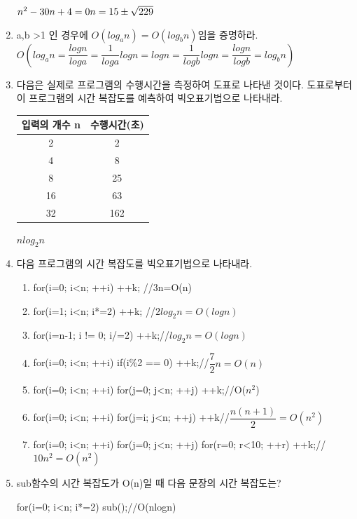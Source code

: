 \documentclass[11pt,a4paper]{article}
\begin{document}
\begin{enumerate}
$n^2-30n+4=0\\n=15\pm\sqrt{229}$

\item a,b \textgreater 1 인 경우에 $O(log_an) = O(log_bn)$임을 증명하라.\\
$O(log_an=\dfrac{logn}{loga}=\dfrac{1}{loga}logn=logn=\dfrac{1}{logb}logn=\dfrac{logn}{logb}=log_bn)$

\item 다음은 실제로 프로그램의 수행시간을 측정하여 도표로 나타낸 것이다. 도표로부터 이 프로그램의 시간 복잡도를 예측하여 빅오표기법으로 나타내라.\\

\begin{tabular}{c|c}
	
	입력의 개수 n & 수행시간(초)\\
	\hline
	2&2\\
	4&8\\
	8&25\\16&63\\32&162\\
\end{tabular}
	
	$nlog_2n$
	
\item 다음 프로그램의 시간 복잡도를 빅오표기법으로 나타내라.
\begin{enumerate}
	\item for(i=0; i\textless n; ++i) ++k; //3n=O(n)
	\item for(i=1; i\textless n; i*=2) ++k; //$2log_2n=O(logn)$
	\item for(i=n-1; i != 0; i/=2) ++k;//$log_2n=O(logn)$
	\item for(i=0; i\textless n; ++i) if(i\%2 == 0) ++k;//$\dfrac{7}{2}n=O(n)$
	\item for(i=0; i\textless n; ++i) for(j=0; j\textless n; ++j) ++k;//O($n^2$)
	\item for(i=0; i\textless n; ++i) for(j=i; j\textless n; ++j) ++k//$\dfrac{n(n+1)}{2}=O(n^2)$
	\item for(i=0; i\textless n; ++i) for(j=0; j\textless n; ++j) for(r=0; r\textless 10; ++r) ++k;//$10n^2=O(n^2)$
\end{enumerate}

\item sub함수의 시간 복잡도가 O(n)일 때 다음 문장의 시간 복잡도는?

for(i=0; i\textless n; i*=2) sub();//O(nlogn)


\end{enumerate}
\end{document}
